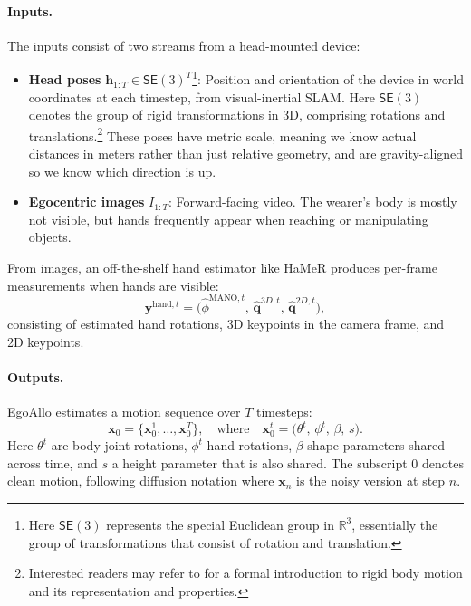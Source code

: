 \documentclass[../../book-main.tex]{subfiles}
\begin{document}
\paragraph{Inputs.}
The inputs consist of two streams from a head-mounted device:
\begin{itemize}
\item \textbf{Head poses} $\boldsymbol{h}_{1:T} \in
\mathsf{SE}(3)^T$\footnote{Here $\mathsf{SE}(3)$ represents the
    special Euclidean group in $\mathbb{R}^3$, essentially the group of
transformations that consist of rotation and translation.}:
Position and orientation of the device in world coordinates
at each timestep, from visual-inertial SLAM. Here $\mathsf{SE}(3)$
denotes the group of rigid transformations in 3D, comprising
rotations and translations.\footnote{Interested readers may
    refer to \cite{MaY2003} for a formal introduction to rigid
body motion and its representation and properties.} These
poses have metric scale, meaning we know actual distances in
meters rather than just relative geometry, and are
gravity-aligned so we know which direction is up.
\item \textbf{Egocentric images} $I_{1:T}$: Forward-facing video.
The wearer's body is mostly not visible, but hands frequently
appear when reaching or manipulating objects.
\end{itemize}

From images, an off-the-shelf hand estimator like HaMeR
\citep{pavlakos2023hamer} produces per-frame measurements when hands
are visible:
\begin{equation}
\boldsymbol{y}^{\text{hand},t} = \big(\hat{\phi}^{\text{MANO},t},\,
\hat{\boldsymbol{q}}^{3D,t},\, \hat{\boldsymbol{q}}^{2D,t}\big),
\end{equation}
consisting of estimated hand rotations, 3D keypoints in the camera
frame, and 2D keypoints.

\paragraph{Outputs.}
EgoAllo estimates a motion sequence over $T$ timesteps:
\begin{equation}
\boldsymbol{x}_0 = \{\boldsymbol{x}_0^{1}, \dots, \boldsymbol{x}_0^{T}\},
\quad\text{where}\quad
\boldsymbol{x}_0^{t} = \big(\theta^t,\, \phi^t,\, \beta,\, s\big).
\end{equation}
Here $\theta^t$ are body joint rotations, $\phi^t$ hand rotations,
$\beta$ shape parameters shared across time, and $s$ a height
parameter that is also shared. The subscript $0$ denotes clean
motion, following diffusion notation where $\boldsymbol{x}_n$ is the noisy
version at step $n$.
\end{document}
